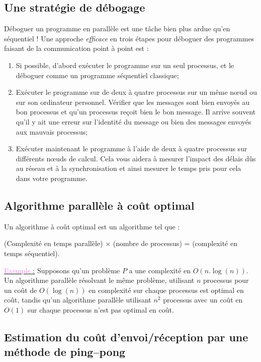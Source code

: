 \documentclass[fleqn,11pt]{article}
\begin{document}
\subsection{Une stratégie de débogage}

Déboguer un programme en parallèle est une tâche bien plus ardue qu'en séquentiel !
Une approche \textsl{efficace} en trois étapes pour déboguer des programmes faisant
de la communication point à point est :
\begin{enumerate}
 \item Si possible, d'abord exécuter le programme sur un seul processus, et le déboguer comme
 un programme séquentiel classique;
 \item Exécuter le programme sur de deux à quatre processus sur un même n{\oe}ud ou sur son ordinateur
 personnel. Vérifier que les messages sont bien envoyés au bon processus et qu'un processus reçoit bien
 le bon message. Il arrive souvent qu'il y ait une erreur sur l'identité du message ou bien des messages
 envoyés aux mauvais processus;
 \item Exécuter maintenant le programme à l'aide de deux à quatre processus sur différents
 n{\oe}uds de calcul. Cela vous aidera à mesurer l'impact des délais dûs au réseau et à la
 synchronisation et ainsi mesurer le temps pris pour cela dans votre programme.
\end{enumerate}


\subsection{Algorithme parallèle à coût optimal}

Un algorithme à coût optimal est un algorithme tel que :
\begin{center}
 (Complexité en temps parallèle) $\times$ (nombre de processus) = (complexité en temps séquentiel).
\end{center}

\underline{\textcolor{violet}{Exemple} :} Supposons qu'un problème $P$ a une complexité en $O(n.\log(n))$.
Un algorithme parallèle résolvant le même problème, utilisant $n$ processus pour un coût de $O(\log(n))$
en complexité sur chaque processus est optimal en coût, tandis qu'un algorithme parallèle utilisant
$n^{2}$ processus avec un coût en  $O(1)$ sur chaque processus n'est pas optimal en coût.

\subsection{Estimation du coût d'envoi/réception par une méthode de ping--pong}
\end{document}
